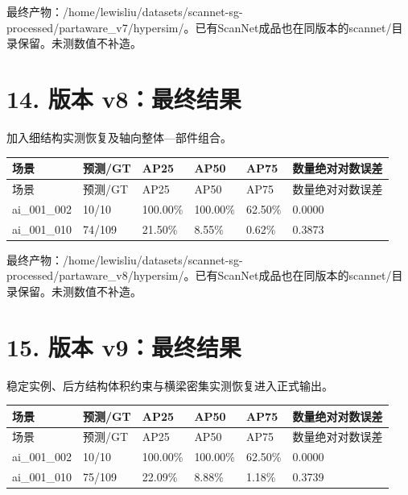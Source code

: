 \documentclass[UTF8,fontset=fandol]{ctexart}
\begin{document}
最终产物：/home/lewisliu/datasets/scannet-sg-processed/partaware\_v7/hypersim/。已有ScanNet成品也在同版本的scannet/目录保留。未测数值不补造。



\section*{14. 版本 v8：最终结果}

加入细结构实测恢复及轴向整体—部件组合。



{\small
\begin{longtable}{|p{}|p{}|p{}|p{}|p{}|p{}|}
\hline
场景 & 预测/GT & AP25 & AP50 & AP75 & 数量绝对对数误差 \\ \hline
\endfirsthead
\hline
场景 & 预测/GT & AP25 & AP50 & AP75 & 数量绝对对数误差 \\ \hline
\endhead
ai\_001\_002 & 10/10 & 100.00\% & 100.00\% & 62.50\% & 0.0000 \\ \hline
ai\_001\_010 & 74/109 & 21.50\% & 8.55\% & 0.62\% & 0.3873 \\ \hline
\end{longtable}
}

最终产物：/home/lewisliu/datasets/scannet-sg-processed/partaware\_v8/hypersim/。已有ScanNet成品也在同版本的scannet/目录保留。未测数值不补造。



\section*{15. 版本 v9：最终结果}

稳定实例、后方结构体积约束与横梁密集实测恢复进入正式输出。



{\small
\begin{longtable}{|p{}|p{}|p{}|p{}|p{}|p{}|}
\hline
场景 & 预测/GT & AP25 & AP50 & AP75 & 数量绝对对数误差 \\ \hline
\endfirsthead
\hline
场景 & 预测/GT & AP25 & AP50 & AP75 & 数量绝对对数误差 \\ \hline
\endhead
ai\_001\_002 & 10/10 & 100.00\% & 100.00\% & 62.50\% & 0.0000 \\ \hline
ai\_001\_010 & 75/109 & 22.09\% & 8.88\% & 1.18\% & 0.3739 \\ \hline
\end{longtable}
}
\end{document}
